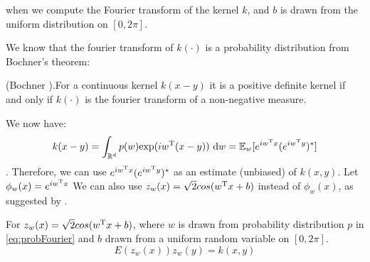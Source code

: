 \documentclass[english]{article}
\begin{document}
when we compute the Fourier transform of the kernel $k$, and $b$ is drawn from the uniform distribution on $[0, 2\pi]$.

We know that the fourier transform of $k(\cdot)$ is a probability distribution from Bochner's theorem:
\begin{thm} \label{thm:Bochner}
	(Bochner \cite{Rudin_1990}).For a continuous kernel $k(x - y)$  it is a positive definite kernel if and only if $k(\cdot)$ is the fourier transform of a non-negative measure.
\end{thm}
We now have:
\[ k(x - y) = \int_{\mathbb{R}^d} p(w) \text{exp}(iw^{\text{T}}(x - y)) ~ \text{d}w = \mathbb{E}_w[e^{iw^{\text{T}}x}(e^{iw^{\text{T}}y})^*] \].
Therefore, we can use $e^{iw^{\text{T}}x}(e^{iw^{\text{T}}y})^*$ as an estimate (unbiased) of $k(x, y)$.
Let $\phi_w(x) = e^{iw^{\text{T}}x}$
We can also use $z_w(x) = \sqrt{2}cos(w^{\text{T}}x + b)$ instead of $\phi_w(x)$, as suggested by \cite{RFF_Rahimi}.
\begin{prop}
	For $z_w(x) = \sqrt{2}cos(w^{\text{T}}x + b)$, where $w$ is drawn from probability distribution $p$ in \eqref{eq:probFourier} and $b$ drawn from a uniform random variable on $[0, 2\pi]$.
	\[E(z_w(x))z_w(y) = k(x,y)\]
\end{prop}
\end{document}
